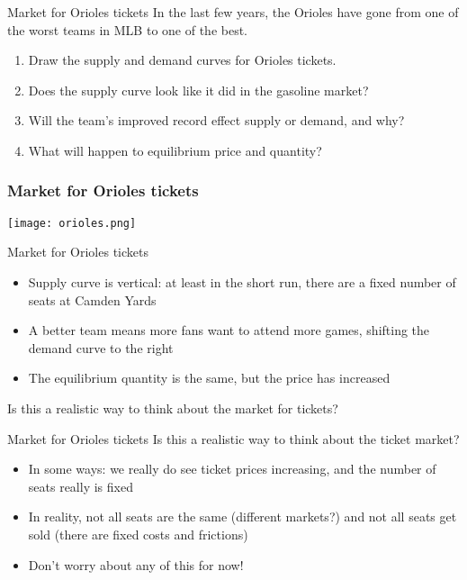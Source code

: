 \documentclass[aspectratio=169]{beamer}
\begin{document}
\begin{frame}{Market for Orioles tickets}
    In the last few years, the Orioles have gone from one of the worst teams in MLB to one of the best.

    \begin{enumerate}
        \item Draw the supply and demand curves for Orioles tickets.
        \item Does the supply curve look like it did in the gasoline market?
        \item Will the team's improved record effect supply or demand, and why?
        \item What will happen to equilibrium price and quantity?
    \end{enumerate}
\end{frame}

\begin{frame}
    \frametitle{Market for Orioles tickets}
    \centering
    \texttt{[image: orioles.png]}
\end{frame}

\begin{frame}{Market for Orioles tickets}
    \begin{itemize}
        \item Supply curve is vertical: at least in the short run, there are a fixed number of seats at Camden Yards
        \item A better team means more fans want to attend more games, shifting the demand curve to the right
        \item The equilibrium quantity is the same, but the price has increased
    \end{itemize}

    Is this a realistic way to think about the market for tickets?
\end{frame}

\begin{frame}{Market for Orioles tickets}
    Is this a realistic way to think about the ticket market?
    \begin{itemize}
        \item In some ways: we really do see ticket prices increasing, and the number of seats really is fixed
        \item In reality, not all seats are the same (different markets?) and not all seats get sold (there are fixed costs and frictions)
        \item Don't worry about any of this for now!
    \end{itemize}
\end{frame}
\end{document}
